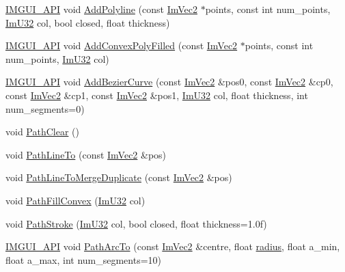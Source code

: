 \begin{DoxyCompactItemize}
\item 
\mbox{\hyperlink{imgui_8h_a43829975e84e45d1149597467a14bbf5}{I\+M\+G\+U\+I\+\_\+\+A\+PI}} void \mbox{\hyperlink{struct_im_draw_list_aad1fcecdd4602fe6bb253fdee8ad5378}{Add\+Polyline}} (const \mbox{\hyperlink{struct_im_vec2}{Im\+Vec2}} $\ast$points, const int num\+\_\+points, \mbox{\hyperlink{imgui_8h_a118cff4eeb8d00e7d07ce3d6460eed36}{Im\+U32}} col, bool closed, float thickness)
\item 
\mbox{\hyperlink{imgui_8h_a43829975e84e45d1149597467a14bbf5}{I\+M\+G\+U\+I\+\_\+\+A\+PI}} void \mbox{\hyperlink{struct_im_draw_list_a9817e2a41cffdd2ff810a715bdb0eba9}{Add\+Convex\+Poly\+Filled}} (const \mbox{\hyperlink{struct_im_vec2}{Im\+Vec2}} $\ast$points, const int num\+\_\+points, \mbox{\hyperlink{imgui_8h_a118cff4eeb8d00e7d07ce3d6460eed36}{Im\+U32}} col)
\item 
\mbox{\hyperlink{imgui_8h_a43829975e84e45d1149597467a14bbf5}{I\+M\+G\+U\+I\+\_\+\+A\+PI}} void \mbox{\hyperlink{struct_im_draw_list_afd2eeeb8ed23b6222513953b03620101}{Add\+Bezier\+Curve}} (const \mbox{\hyperlink{struct_im_vec2}{Im\+Vec2}} \&pos0, const \mbox{\hyperlink{struct_im_vec2}{Im\+Vec2}} \&cp0, const \mbox{\hyperlink{struct_im_vec2}{Im\+Vec2}} \&cp1, const \mbox{\hyperlink{struct_im_vec2}{Im\+Vec2}} \&pos1, \mbox{\hyperlink{imgui_8h_a118cff4eeb8d00e7d07ce3d6460eed36}{Im\+U32}} col, float thickness, int num\+\_\+segments=0)
\item 
void \mbox{\hyperlink{struct_im_draw_list_ae9ad5f4d638b1bfd9383618dc60e3f18}{Path\+Clear}} ()
\item 
void \mbox{\hyperlink{struct_im_draw_list_a828d944325ed58d8b57abd3647bffaaf}{Path\+Line\+To}} (const \mbox{\hyperlink{struct_im_vec2}{Im\+Vec2}} \&pos)
\item 
void \mbox{\hyperlink{struct_im_draw_list_aa3dd11945fb62495f8b9e1392ed724e3}{Path\+Line\+To\+Merge\+Duplicate}} (const \mbox{\hyperlink{struct_im_vec2}{Im\+Vec2}} \&pos)
\item 
void \mbox{\hyperlink{struct_im_draw_list_aea9301cb99ebf4b27f5d3959017567c9}{Path\+Fill\+Convex}} (\mbox{\hyperlink{imgui_8h_a118cff4eeb8d00e7d07ce3d6460eed36}{Im\+U32}} col)
\item 
void \mbox{\hyperlink{struct_im_draw_list_ac3172e376a4b77915bb22b6d8092b8b2}{Path\+Stroke}} (\mbox{\hyperlink{imgui_8h_a118cff4eeb8d00e7d07ce3d6460eed36}{Im\+U32}} col, bool closed, float thickness=1.\+0f)
\item 
\mbox{\hyperlink{imgui_8h_a43829975e84e45d1149597467a14bbf5}{I\+M\+G\+U\+I\+\_\+\+A\+PI}} void \mbox{\hyperlink{struct_im_draw_list_acb69ef7febcc54c9e5e09d2460c85b61}{Path\+Arc\+To}} (const \mbox{\hyperlink{struct_im_vec2}{Im\+Vec2}} \&centre, float \mbox{\hyperlink{graphics_8cpp_a5050a760c11da521cd4aee6336f6529f}{radius}}, float a\+\_\+min, float a\+\_\+max, int num\+\_\+segments=10)

\end{DoxyCompactItemize}
